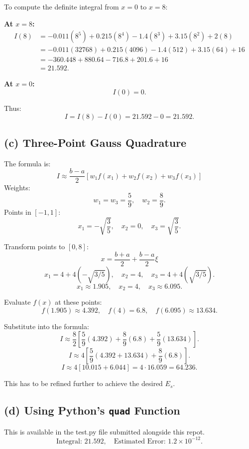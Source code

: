 \documentclass[11pt]{article}
\begin{document}
To compute the definite integral from \(x = 0\) to \(x = 8\):

\textbf{At \(x = 8\):}
\begin{align*}
I(8) &= -0.011(8^5) + 0.215(8^4) - 1.4(8^3) + 3.15(8^2) + 2(8) \\
     &= -0.011(32768) + 0.215(4096) - 1.4(512) + 3.15(64) + 16 \\
     &= -360.448 + 880.64 - 716.8 + 201.6 + 16 \\
     &= 21.592.
\end{align*}

\textbf{At \(x = 0\):}
\[
I(0) = 0.
\]

Thus:
\[
I = I(8) - I(0) = 21.592 - 0 = 21.592.
\]



\subsection*{(c) Three-Point Gauss Quadrature}

The formula is:
\[
I \approx \frac{b-a}{2} \left[w_1f(x_1) + w_2f(x_2) + w_3f(x_3)\right]
\]
Weights:
\[
w_1 = w_3 = \frac{5}{9}, \quad w_2 = \frac{8}{9}.
\]
Points in \([-1, 1]\):
\[
x_1 = -\sqrt{\frac{3}{5}}, \quad x_2 = 0, \quad x_3 = \sqrt{\frac{3}{5}}.
\]

Transform points to \([0, 8]\):
\[
x = \frac{b+a}{2} + \frac{b-a}{2}\xi
\]
\[
x_1 = 4 + 4(-\sqrt{3/5}), \quad x_2 = 4, \quad x_3 = 4 + 4(\sqrt{3/5}).
\]
\[
x_1 \approx 1.905, \quad x_2 = 4, \quad x_3 \approx 6.095.
\]

Evaluate \(f(x)\) at these points:
\[
f(1.905) \approx 4.392, \quad f(4) = 6.8, \quad f(6.095) \approx 13.634.
\]

Substitute into the formula:
\[
I \approx \frac{8}{2} \left[\frac{5}{9}(4.392) + \frac{8}{9}(6.8) + \frac{5}{9}(13.634)\right].
\]
\[
I \approx 4 \left[\frac{5}{9}(4.392 + 13.634) + \frac{8}{9}(6.8)\right].
\]
\[
I \approx 4 \left[10.015 + 6.044\right] = 4 \cdot 16.059 = 64.236.
\]

This has to be refined further to achieve the desired \(E_s\).

\subsection*{(d) Using Python’s \texttt{quad} Function}

This is available in the test.py file submitted alongside this repot. 
\[
\text{Integral: } 21.592, \quad \text{Estimated Error: } 1.2 \times 10^{-12}.
\]
\end{document}

